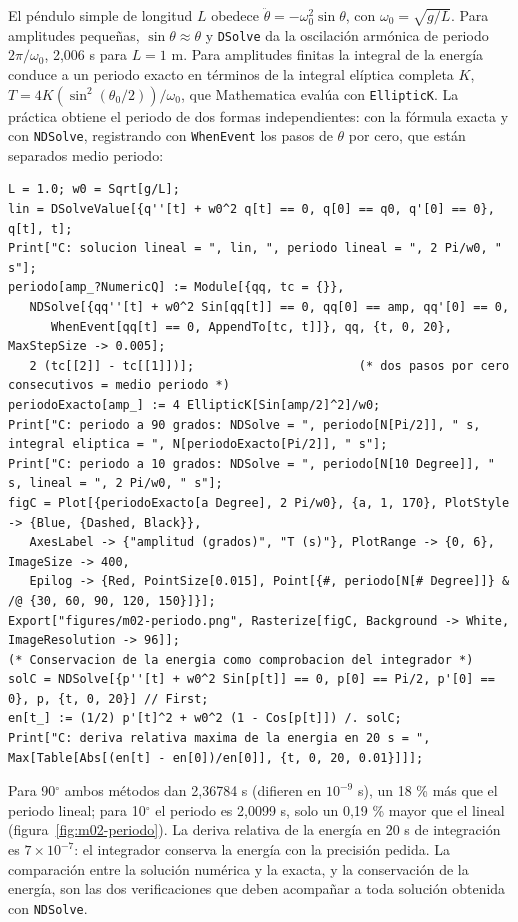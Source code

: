 \documentclass[10pt,openany]{book}
\begin{document}
El péndulo simple de longitud \(L\) obedece \(\ddot\theta = -\omega_0^{2}\sin\theta\), con \(\omega_0 = \sqrt{g/L}\). Para amplitudes pequeñas, \(\sin\theta \approx \theta\) y \texttt{DSolve} da la oscilación armónica de periodo \(2\pi/\omega_0\), 2,006 s para \(L = 1\) m. Para amplitudes finitas la integral de la energía conduce a un periodo exacto en términos de la integral elíptica completa \(K\), \(T = 4K(\sin^{2}(\theta_0/2))/\omega_0\), que Mathematica evalúa con \texttt{EllipticK}. La práctica obtiene el periodo de dos formas independientes: con la fórmula exacta y con \texttt{NDSolve}, registrando con \texttt{WhenEvent} los pasos de \(\theta\) por cero, que están separados medio periodo:
\begin{lstlisting}[style=studium]
L = 1.0; w0 = Sqrt[g/L];
lin = DSolveValue[{q''[t] + w0^2 q[t] == 0, q[0] == q0, q'[0] == 0}, q[t], t];
Print["C: solucion lineal = ", lin, ", periodo lineal = ", 2 Pi/w0, " s"];
periodo[amp_?NumericQ] := Module[{qq, tc = {}},
   NDSolve[{qq''[t] + w0^2 Sin[qq[t]] == 0, qq[0] == amp, qq'[0] == 0,
      WhenEvent[qq[t] == 0, AppendTo[tc, t]]}, qq, {t, 0, 20}, MaxStepSize -> 0.005];
   2 (tc[[2]] - tc[[1]])];                       (* dos pasos por cero consecutivos = medio periodo *)
periodoExacto[amp_] := 4 EllipticK[Sin[amp/2]^2]/w0;
Print["C: periodo a 90 grados: NDSolve = ", periodo[N[Pi/2]], " s, integral eliptica = ", N[periodoExacto[Pi/2]], " s"];
Print["C: periodo a 10 grados: NDSolve = ", periodo[N[10 Degree]], " s, lineal = ", 2 Pi/w0, " s"];
figC = Plot[{periodoExacto[a Degree], 2 Pi/w0}, {a, 1, 170}, PlotStyle -> {Blue, {Dashed, Black}},
   AxesLabel -> {"amplitud (grados)", "T (s)"}, PlotRange -> {0, 6}, ImageSize -> 400,
   Epilog -> {Red, PointSize[0.015], Point[{#, periodo[N[# Degree]]} & /@ {30, 60, 90, 120, 150}]}];
Export["figures/m02-periodo.png", Rasterize[figC, Background -> White, ImageResolution -> 96]];
(* Conservacion de la energia como comprobacion del integrador *)
solC = NDSolve[{p''[t] + w0^2 Sin[p[t]] == 0, p[0] == Pi/2, p'[0] == 0}, p, {t, 0, 20}] // First;
en[t_] := (1/2) p'[t]^2 + w0^2 (1 - Cos[p[t]]) /. solC;
Print["C: deriva relativa maxima de la energia en 20 s = ", Max[Table[Abs[(en[t] - en[0])/en[0]], {t, 0, 20, 0.01}]]];
\end{lstlisting}
Para 90\(^\circ\) ambos métodos dan 2,36784 s (difieren en \(10^{-9}\) s), un 18 \% más que el periodo lineal; para 10\(^\circ\) el periodo es 2,0099 s, solo un 0,19 \% mayor que el lineal (figura~\ref{fig:m02-periodo}). La deriva relativa de la energía en 20 s de integración es \(7\times 10^{-7}\): el integrador conserva la energía con la precisión pedida. La comparación entre la solución numérica y la exacta, y la conservación de la energía, son las dos verificaciones que deben acompañar a toda solución obtenida con \texttt{NDSolve}.
\end{document}

